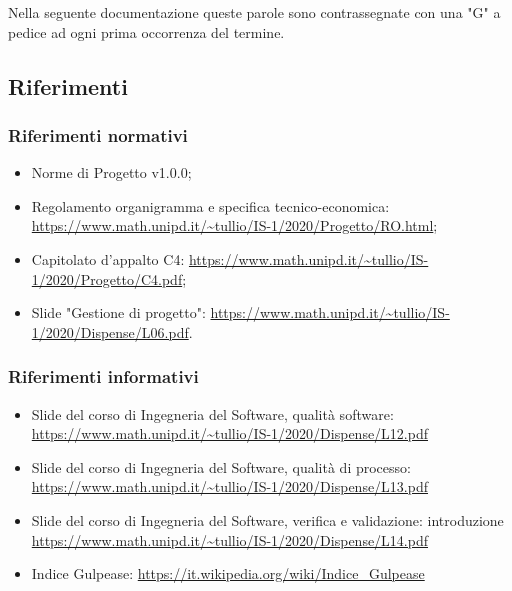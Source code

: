 \documentclass[../piano_di_qualifica.tex]{subfiles}
\begin{document}
Nella seguente documentazione queste parole sono contrassegnate con una "G" a pedice ad ogni prima occorrenza del termine.

\subsection{Riferimenti}

\subsubsection{Riferimenti normativi}
\begin{itemize}
	\item Norme di Progetto v1.0.0;
	\item Regolamento organigramma e specifica tecnico-economica: \url{https://www.math.unipd.it/~tullio/IS-1/2020/Progetto/RO.html};
	\item Capitolato d’appalto C4: \url{https://www.math.unipd.it/~tullio/IS-1/2020/Progetto/C4.pdf};
	\item Slide "Gestione di progetto": \url{https://www.math.unipd.it/~tullio/IS-1/2020/Dispense/L06.pdf}.
\end{itemize}

\subsubsection{Riferimenti informativi}

\begin{itemize}
	\item Slide del corso di Ingegneria del Software, qualità software: \url{https://www.math.unipd.it/~tullio/IS-1/2020/Dispense/L12.pdf}
	\item Slide del corso di Ingegneria del Software, qualità di processo: \url{https://www.math.unipd.it/~tullio/IS-1/2020/Dispense/L13.pdf}
	\item Slide del corso di Ingegneria del Software, verifica e validazione: introduzione \url{https://www.math.unipd.it/~tullio/IS-1/2020/Dispense/L14.pdf}
	\item Indice Gulpease: \url{https://it.wikipedia.org/wiki/Indice_Gulpease}
\end{itemize}
\end{document}
